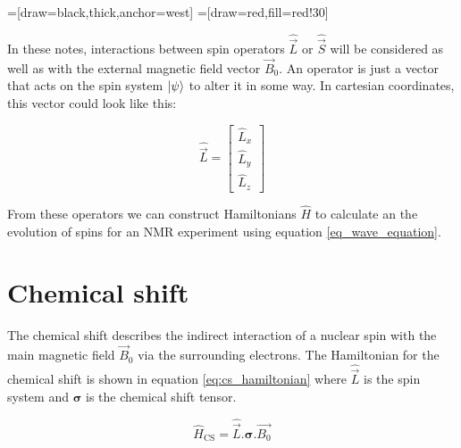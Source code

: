 \documentclass[11pt]{article}
\theoremstyle{definition}
\begin{document}
=[draw=black,thick,anchor=west]
=[draw=red,fill=red!30]

In these notes, interactions between spin operators $\hat{\vec L}$ or $\hat{\vec S}$ will be considered as well as with the external magnetic field vector $\vec B_0$. An operator is just a vector that acts on the spin system $\ket{\psi}$ to alter it in some way. In cartesian coordinates, this vector could look like this:

\begin{equation}
	\hat{\vec L}=
	\begin{bmatrix}
		\hat L_x \\
		\hat L_y \\
		\hat L_z
	\end{bmatrix}
\end{equation}

From these operators we can construct Hamiltonians $\hat H$ to calculate an the evolution of spins for an NMR experiment using equation \ref{eq_wave_equation}.

\section{Chemical shift}
The chemical shift describes the indirect interaction of a nuclear spin with the main magnetic field $\vec B_0$ via the surrounding electrons. The Hamiltonian for the chemical shift is shown in equation \ref{eq:cs_hamiltonian} where $\hat{\vec L}$ is the spin system and $\mathbf{\sigma}$ is the chemical shift tensor.

\begin{equation}
	\label{eq:cs_hamiltonian}
	\hat H_\text{CS} = \hat{\vec L} .\mathbf{\sigma}. \vec{B_0}
\end{equation}
\end{document}

